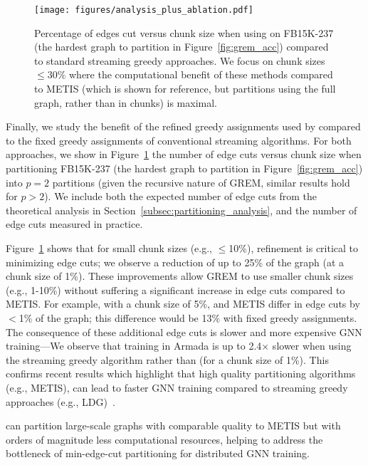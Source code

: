 \begin{figure}[t]
  \centering
  \texttt{[image: figures/analysis\_plus\_ablation.pdf]}
  \vspace{-0.15in}
  \caption{Percentage of edges cut versus chunk size when using \partitioning on FB15K-237 (the hardest graph to partition in Figure~\ref{fig:grem_acc}) compared to standard streaming greedy approaches. We focus on chunk sizes $\le 30\%$ where the computational benefit of these methods compared to METIS (which is shown for reference, but partitions using the full graph, rather than in chunks) is maximal.}
  \label{fig:grem_ablation}
  \vspace{-0.15in}
\end{figure}

Finally, we study the benefit of the refined greedy assignments used by \partitioning compared to the fixed greedy assignments of conventional streaming algorithms. For both approaches, we show in Figure~\ref{fig:grem_ablation} the number of edge cuts versus chunk size when partitioning FB15K-237 (the hardest graph to partition in Figure~\ref{fig:grem_acc}) into $p=2$ partitions (given the recursive nature of GREM, similar results hold for $p>2$). We include both the expected number of edge cuts from the theoretical analysis in Section~\ref{subsec:partitioning_analysis}, and the number of edge cuts measured in practice.

Figure~\ref{fig:grem_ablation} shows that for small chunk sizes (e.g., $\le$10\%), refinement is critical to minimizing edge cuts; we observe a reduction of up to 25\% of the graph (at a chunk size of 1\%). These improvements allow GREM to use smaller chunk sizes (e.g., 1-10\%) without suffering a significant increase in edge cuts compared to METIS. For example, with a chunk size of 5\%, \partitioning and METIS differ in edge cuts by $<$1\% of the graph; this difference would be 13\% with fixed greedy assignments. The consequence of these additional edge cuts is slower and more expensive GNN training---We observe that training in Armada is up to 2.4$\times$ slower when using the streaming greedy algorithm rather than \partitioning (for a chunk size of 1\%). This confirms recent results which highlight that high quality partitioning algorithms (e.g., METIS), can lead to faster GNN training compared to streaming greedy approaches (e.g., LDG)~\cite{merkel2023experimental}.

\partitioning can partition large-scale graphs with comparable quality to METIS but with orders of magnitude less computational resources, helping to address the bottleneck of min-edge-cut partitioning for distributed GNN training.



